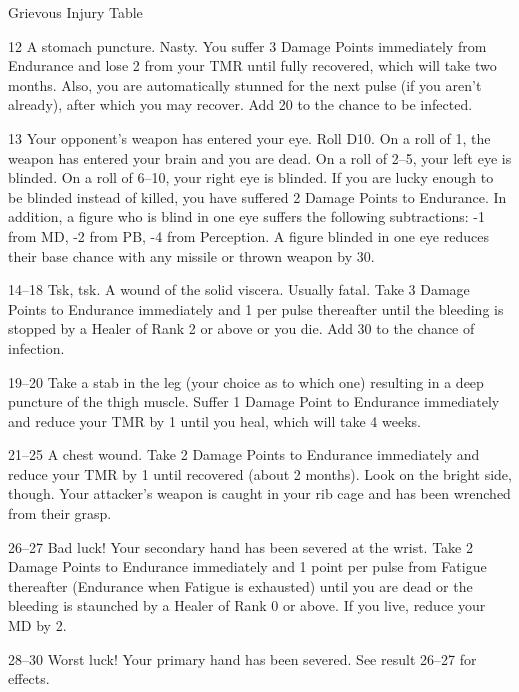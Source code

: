 \begin{Chapter}{Grievous Injury Table}
\begin{Description}
\item[12] A stomach puncture. Nasty. You suffer 3 Damage Points
  immediately from Endurance and lose 2 from your TMR until fully
  recovered, which will take two months. Also, you are automatically
  stunned for the next pulse (if you aren’t already), after which you
  may recover.  Add 20 to the chance to be infected.

\item[13] Your opponent’s weapon has entered your eye. Roll D10. On a
  roll of 1, the weapon has entered your brain and you are dead.  On a
  roll of 2–5, your left eye is blinded.  On a roll of 6–10, your
  right eye is blinded. If you are lucky enough to be blinded instead
  of killed, you have suffered 2 Damage Points to Endurance. In
  addition, a figure who is blind in one eye suffers the following
  subtractions: -1 from MD, -2 from PB, -4 from Perception. A figure
  blinded in one eye reduces their base chance with any missile or
  thrown weapon by 30.

\item[14–18] Tsk, tsk. A wound of the solid viscera.  Usually
  fatal. Take 3 Damage Points to Endurance immediately and 1 per pulse
  thereafter until the bleeding is stopped by a Healer of Rank 2 or
  above or you die.  Add 30 to the chance of infection.

\item[19–20] Take a stab in the leg (your choice as to which one)
  resulting in a deep puncture of the thigh muscle. Suffer 1 Damage
  Point to Endurance immediately and reduce your TMR by 1 until you
  heal, which will take 4 weeks.

\item[21–25] A chest wound. Take 2 Damage Points to Endurance
  immediately and reduce your TMR by 1 until recovered (about 2
  months). Look on the bright side, though.  Your attacker’s weapon is
  caught in your rib cage and has been wrenched from their grasp.

\item[26–27] Bad luck! Your secondary hand has been severed at the
  wrist. Take 2 Damage Points to Endurance immediately and 1 point per
  pulse from Fatigue thereafter (Endurance when Fatigue is exhausted)
  until you are dead or the bleeding is staunched by a Healer of Rank
  0 or above. If you live, reduce your MD by 2.

\item[28–30] Worst luck!  Your primary hand has been severed. See
  result 26–27 for effects.


\end{Description}
\end{Chapter}
